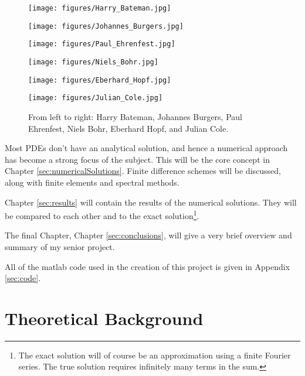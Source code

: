 \documentclass[undefended]{sfuthesis}
\begin{document}
\begin{figure}[h!]
	\begin{minipage}{0.16\textwidth}
		\texttt{[image: figures/Harry\_Bateman.jpg]}
	\end{minipage}\hfill
	\begin{minipage}{0.16\textwidth}
		\texttt{[image: figures/Johannes\_Burgers.jpg]}
	\end{minipage}\hfill
	\begin{minipage}{0.16\textwidth}%
		\texttt{[image: figures/Paul\_Ehrenfest.jpg]}
	\end{minipage}
	\begin{minipage}{0.16\textwidth}%
		\texttt{[image: figures/Niels\_Bohr.jpg]}
	\end{minipage}
	\begin{minipage}{0.16\textwidth}%
		\texttt{[image: figures/Eberhard\_Hopf.jpg]}
	\end{minipage}
	\begin{minipage}{0.16\textwidth}%
		\texttt{[image: figures/Julian\_Cole.jpg]}
	\end{minipage}
	\caption{From left to right: Harry Bateman, Johannes Burgers, Paul Ehrenfest, Niels Bohr, Eberhard Hopf, and Julian Cole.}
	\label{fig:people}
\end{figure}

Most PDEs don't have an analytical solution, and hence a numerical approach has become a strong focus of the subject. This will be the core concept in Chapter \ref{sec:numericalSolutions}. Finite difference schemes will be discussed, along with finite elements and spectral methods. 

Chapter \ref{sec:results} will contain the results of the numerical solutions. They will be compared to each other and to the exact solution\footnote{The exact solution will of course be an approximation using a finite Fourier series. The true solution requires infinitely many terms in the sum.}. 

The final Chapter, Chapter \ref{sec:conclusions}, will give a very brief overview and summary of my senior project.

All of the matlab code used in the creation of this project is given in Appendix \ref{sec:code}.

\chapter{Theoretical Background}
\label{sec:background}
\end{document}

